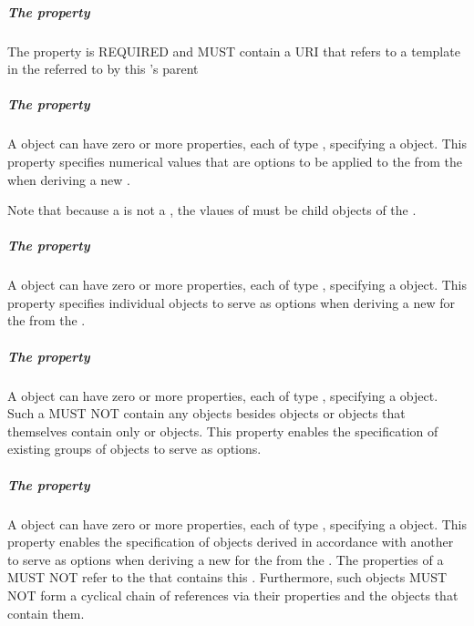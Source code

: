 \subparagraph{The  property}\label{sec:variable}

The  property is REQUIRED and MUST contain a URI that refers to a template  in the   referred to by this 's parent 

\subparagraph{The  property}\label{sec:variantMeasure}

A  object can have zero or more  properties, each of type , specifying a  object. This property specifies numerical values that are options to be applied to the   from the  when deriving a new .

Note that because a  is not a , the vlaues of  must be child objects of the .

\subparagraph{The  property}\label{sec:variant}

A  object can have zero or more  properties, each of type , specifying a  object. This property specifies individual  objects to serve as options when deriving a new  for the   from the .

\subparagraph{The  property}\label{sec:variantCollection}

A  object can have zero or more  properties, each of type , specifying a  object.
Such a  MUST NOT contain any objects besides  objects or  objects that themselves contain only  or  objects.
This property enables the specification of existing groups of  objects to serve as options.

\subparagraph{The  property}\label{sec:variantDerivation}

A  object can have zero or more  properties, each of type , specifying a  object. 
This property enables the specification of  objects derived in accordance with another  to serve as options when deriving a new  for the   from the . 
The  properties of a  MUST NOT refer to the  that contains this . 
Furthermore, such  objects MUST NOT form a cyclical chain of references via their  properties and the  objects that contain them. 

